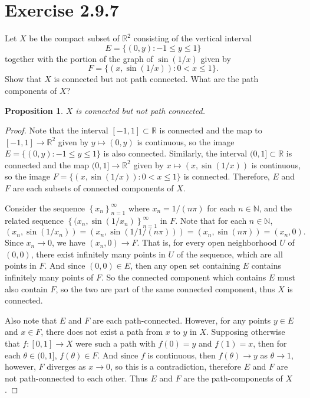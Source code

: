 \documentclass[12pt]{article}
\newtheorem{proposition}{Proposition}
\newenvironment{problem}
    {\begin{lrbox}{\mybox}\begin{minipage}{\textwidth-10pt}}
    {\end{minipage}\end{lrbox}\framebox[6.5in]{\usebox{\mybox}}}
\newcommand{\seq}[2]{\left\{#1\right\}_{#2=1}^\infty}
\newcommand{\N}{\mathbb{N}}
\newcommand{\R}{\mathbb{R}}
\begin{document}
\section*{Exercise 2.9.7}
\begin{problem}
    Let $X$ be the compact subset of $\R^2$ consisting of the vertical interval
    \[E=\{(0,y) : -1\leq y \leq 1\}\]
    together with the portion of the graph of $\sin(1/x)$ given by
    \[F = \{(x,\sin(1/x)) : 0 < x \leq 1\}.\]
    Show that $X$ is connected but not path connected. What are the path components of $X$?
\end{problem}

\begin{proposition}
    $X$ is connected but not path connected.
\end{proposition}

\begin{proof}
    Note that the interval $[-1,1]\subset\R$ is connected and the map to $[-1,1]\to\R^2$ given by $y\mapsto (0,y)$ is continuous, so the image $E=\{(0,y) : -1\leq y \leq 1\}$ is also connected. Similarly, the interval $(0,1]\subset\R$ is connected and the map $(0,1]\to\R^2$ given by $x\mapsto(x,\sin(1/x))$ is continuous, so the image $F = \{(x,\sin(1/x)) : 0 < x \leq 1\}$ is connected. Therefore, $E$ and $F$ are each subsets of connected components of $X$.
    
    Consider the sequence $\seq{x_n}{n}$ where $x_n=1/(n\pi)$ for each $n\in\N$, and the related sequence $\seq{(x_n,\sin(1/x_n)}{n}$ in $F$. Note that for each $n\in\N$,
    \[(x_n,\sin(1/x_n)) = (x_n, \sin(1/1/(n\pi))) = (x_n,\sin(n\pi)) = (x_n,0).\]
    Since $x_n\to0$, we have $(x_n,0)\to F$. That is, for every open neighborhood $U$ of $(0,0)$, there exist infinitely many points in $U$ of the sequence, which are all points in $F$. And since $(0,0)\in E$, then any open set containing $E$ contains infinitely many points of $F$. So the connected component which contains $E$ must also contain $F$, so  the two are part of the same connected component, thus $X$ is connected.
    
    Also note that $E$ and $F$ are each path-connected. However, for any points $y\in E$ and $x\in F$, there does not exist a path from $x$ to $y$ in $X$. Supposing otherwise that $f:[0,1]\to X$ were such a path with $f(0)=y$ and $f(1)=x$, then for each $\theta\in(0,1]$, $f(\theta)\in F$. And since $f$ is continuous, then $f(\theta)\to y$ as $\theta\to 1$, however, $F$ diverges as $x\to 0$, so this is a contradiction, therefore $E$ and $F$ are not path-connected to each other. Thus $E$ and $F$ are the path-components of $X$.
\end{proof}
\end{document}
